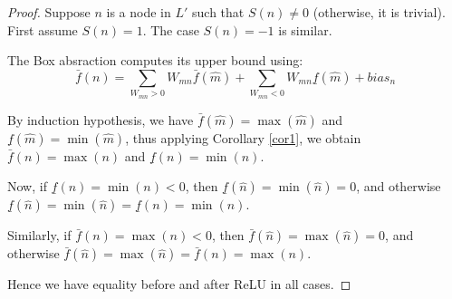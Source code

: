 		\begin{proof}
			Suppose $n$ is a node in $L'$ such that $S(n)\neq 0$ (otherwise, it is trivial). 
			First assume $S(n)=1$. The case $S(n)=-1$ is similar. 
			
			The Box absraction computes its upper bound using:
			$$\bar{f}(n)= \sum_{W_{mn}>0} W_{mn} \bar{f}(\hat{m}) + \sum_{W_{mn}<0} W_{mn} \underline{f}(\hat{m}) + bias_n$$
			
			By induction hypothesis, we have 
			$\bar{f}(\hat{m})=\max(\hat{m})$ and
			$\underline{f}(\hat{m})=\min(\hat{m})$, thus 
			applying Corollary \ref{cor1}, we obtain
			$\bar{f}(n)=\max(n)$ and 
			$\underline{f}(n)=\min(n)$.
			
			Now, if $\underline{f}(n)=\min(n)<0$, 
			then $\underline{f}(\hat{n})=\min(\hat{n})=0$, 
			and otherwise 
			$\underline{f}(\hat{n})=\min(\hat{n})=\underline{f}(n)=\min(n)$.
			
			Similarly, 
			if $\bar{f}(n)=\max(n)<0$, 
			then $\bar{f}(\hat{n})=\max(\hat{n})=0$, 
			and otherwise 
			$\bar{f}(\hat{n})=\max(\hat{n})=\bar{f}(n)=\max(n)$.
			
			Hence we have equality before and after ReLU in all cases.
		\end{proof}
		
